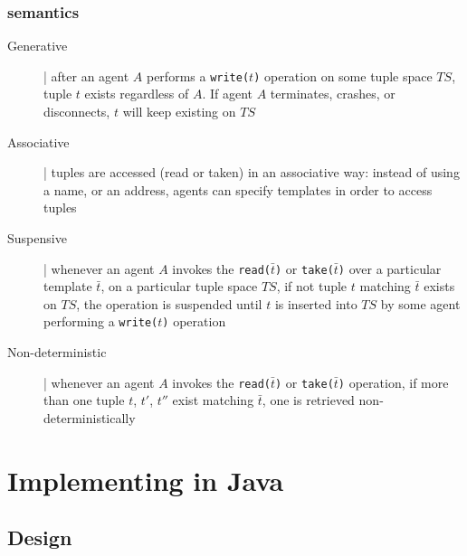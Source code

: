 \documentclass[presentation]{beamer}\mode<presentation>{\usetheme{AMSCesenaPurpleAndGold}}
\begin{document}
\begin{frame}[fragile]
\frametitle{ semantics}
\label{linda-semantics}

\begin{description}
\item[Generative] | after an agent $A$ performs a \texttt{write($t$)} operation on some tuple space $TS$, tuple $t$ \alert{exists} regardless of $A$. 
%
If agent $A$ terminates, crashes, or disconnects, $t$ will keep existing on $TS$

\item[Associative] | tuples are \alert{accessed} (read or taken) in an associative way: instead of using a name, or an address, agents can specify \alert{templates} in order to access tuples

\item[Suspensive] | whenever an agent $A$ invokes the \texttt{read($\bar{t}$)} or \texttt{take($\bar{t}$)} over a particular template $\bar{t}$, on a particular tuple space $TS$, if not tuple $t$ matching $\bar{t}$ exists on $TS$, the operation is \alert{suspended} until $t$ is inserted into $TS$ by some agent performing a \texttt{write($t$)} operation

\item[Non-deterministic] | whenever an agent $A$ invokes the \texttt{read($\bar{t}$)} or \texttt{take($\bar{t}$)} operation, if more than one tuple $t$, $t'$, $t''$ exist matching  $\bar{t}$, one is retrieved \alert{non-deterministically}

\end{description}

\end{frame}


\section{Implementing \linda{} in Java}

\subsection{Design} 
\end{document}
